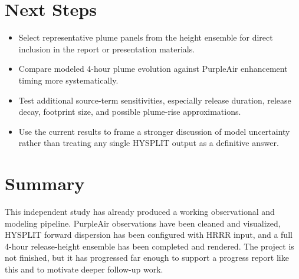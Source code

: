 \documentclass[11pt]{article}
\begin{document}
\section*{Next Steps}

\begin{itemize}
\item Select representative plume panels from the height ensemble for direct inclusion in the report or presentation materials.
\item Compare modeled 4-hour plume evolution against PurpleAir enhancement timing more systematically.
\item Test additional source-term sensitivities, especially release duration, release decay, footprint size, and possible plume-rise approximations.
\item Use the current results to frame a stronger discussion of model uncertainty rather than treating any single HYSPLIT output as a definitive answer.
\end{itemize}

\section*{Summary}

This independent study has already produced a working observational and modeling pipeline. PurpleAir observations have been cleaned and visualized, HYSPLIT forward dispersion has been configured with HRRR input, and a full 4-hour release-height ensemble has been completed and rendered. The project is not finished, but it has progressed far enough to support a progress report like this and to motivate deeper follow-up work.
\end{document}
